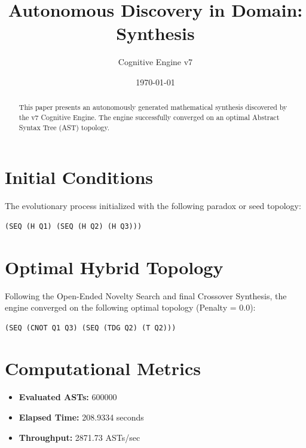 \documentclass{article}
\title{Autonomous Discovery in Domain: Synthesis}
\author{Cognitive Engine v7}
\date{\today}
\begin{document}
\maketitle
\begin{abstract}
This paper presents an autonomously generated mathematical synthesis discovered by the v7 Cognitive Engine. The engine successfully converged on an optimal Abstract Syntax Tree (AST) topology.\end{abstract}
\section{Initial Conditions}
The evolutionary process initialized with the following paradox or seed topology:
\begin{verbatim}
(SEQ (H Q1) (SEQ (H Q2) (H Q3)))
\end{verbatim}
\section{Optimal Hybrid Topology}
Following the Open-Ended Novelty Search and final Crossover Synthesis, the engine converged on the following optimal topology (Penalty = 0.0):
\begin{verbatim}
(SEQ (CNOT Q1 Q3) (SEQ (TDG Q2) (T Q2)))
\end{verbatim}
\section{Computational Metrics}
\begin{itemize}
  \item \textbf{Evaluated ASTs:} 600000
  \item \textbf{Elapsed Time:} 208.9334 seconds
  \item \textbf{Throughput:} 2871.73 ASTs/sec
\end{itemize}
\end{document}
